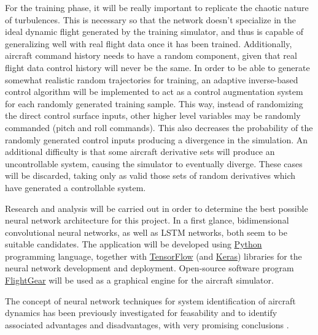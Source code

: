\documentclass[12pt]{article}
\begin{document}
For the training phase, it will be really important to replicate the chaotic nature of turbulences. This is necessary so that the network doesn’t specialize in the ideal dynamic flight generated by the training simulator, and thus is capable of generalizing well with real flight data once it has been trained. Additionally, aircraft command history needs to have a random component, given that real flight data control history will never be the same. In order to be able to generate somewhat realistic random trajectories for training, an adaptive inverse-based control algorithm will be implemented to act as a control augmentation system for each randomly generated training sample. This way, instead of randomizing the direct control surface inputs, other higher level variables may be randomly commanded (pitch and roll commands). This also decreases the probability of the randomly generated control inputs producing a divergence in the simulation. An additional difficulty is that some aircraft derivative sets will produce an uncontrollable system, causing the simulator to eventually diverge. These cases will be discarded, taking only as valid those sets of random derivatives which have generated a controllable system.

Research and analysis will be carried out in order to determine the best possible neural network architecture for this project. In a first glance, bidimensional convolutional neural networks, as well as LSTM networks, both seem to be suitable candidates. The application will be developed using \href{https://www.python.org/}{Python} programming language, together with \href{https://www.tensorflow.org/}{TensorFlow} (and \href{https://www.tensorflow.org/guide/keras}{Keras}) libraries for the neural network development and deployment. Open-source software program \href{https://www.flightgear.org/}{FlightGear} will be used as a graphical engine for the aircraft simulator.

The concept of neural network techniques for system identification of aircraft dynamics has been previously investigated for feasability and to identify associated advantages and disadvantages, with very promising conclusions \cite{Wharington1993}.

\printbibliography
\end{document}
